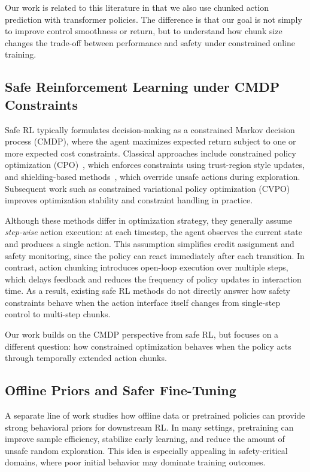 \documentclass{article}
\begin{document}
Our work is related to this literature in that we also use chunked action prediction with transformer policies. The difference is that our goal is not simply to improve control smoothness or return, but to understand how chunk size changes the trade-off between performance and safety under constrained online training.

\subsection{Safe Reinforcement Learning under CMDP Constraints}

Safe RL typically formulates decision-making as a constrained Markov decision process (CMDP), where the agent maximizes expected return subject to one or more expected cost constraints. Classical approaches include constrained policy optimization (CPO)~\citep{achiam2017cpo}, which enforces constraints using trust-region style updates, and shielding-based methods~\citep{alshiekh2018shielding}, which override unsafe actions during exploration. Subsequent work such as constrained variational policy optimization (CVPO) improves optimization stability and constraint handling in practice.

Although these methods differ in optimization strategy, they generally assume \emph{step-wise} action execution: at each timestep, the agent observes the current state and produces a single action. This assumption simplifies credit assignment and safety monitoring, since the policy can react immediately after each transition. In contrast, action chunking introduces open-loop execution over multiple steps, which delays feedback and reduces the frequency of policy updates in interaction time. As a result, existing safe RL methods do not directly answer how safety constraints behave when the action interface itself changes from single-step control to multi-step chunks.

Our work builds on the CMDP perspective from safe RL, but focuses on a different question: how constrained optimization behaves when the policy acts through temporally extended action chunks.

\subsection{Offline Priors and Safer Fine-Tuning}

A separate line of work studies how offline data or pretrained policies can provide strong behavioral priors for downstream RL. In many settings, pretraining can improve sample efficiency, stabilize early learning, and reduce the amount of unsafe random exploration. This idea is especially appealing in safety-critical domains, where poor initial behavior may dominate training outcomes.
\end{document}
